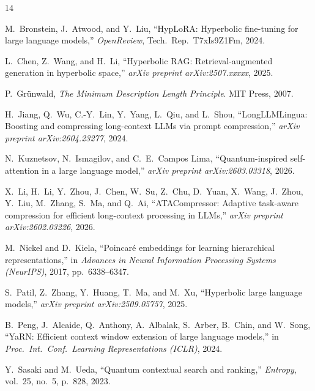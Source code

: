 \documentclass[journal]{IEEEtran}
\begin{document}
\begin{thebibliography}{14}

M.~Bronstein, J.~Atwood, and Y.~Liu,
``HypLoRA: Hyperbolic fine-tuning for large language models,''
\emph{OpenReview}, Tech.\ Rep.\ T7xIs9Z1Fm, 2024.

L.~Chen, Z.~Wang, and H.~Li,
``Hyperbolic RAG: Retrieval-augmented generation in hyperbolic space,''
\emph{arXiv preprint arXiv:2507.xxxxx}, 2025.

P.~Gr\"{u}nwald,
\emph{The Minimum Description Length Principle}.
MIT Press, 2007.

H.~Jiang, Q.~Wu, C.-Y.~Lin, Y.~Yang, L.~Qiu, and L.~Shou,
``LongLLMLingua: Boosting and compressing long-context {LLMs} via prompt
compression,''
\emph{arXiv preprint arXiv:2604.23277}, 2024.

N.~Kuznetsov, N.~Ismagilov, and C.~E.~Campos Lima,
``Quantum-inspired self-attention in a large language model,''
\emph{arXiv preprint arXiv:2603.03318}, 2026.

X.~Li, H.~Li, Y.~Zhou, J.~Chen, W.~Su, Z.~Chu, D.~Yuan, X.~Wang,
J.~Zhou, Y.~Liu, M.~Zhang, S.~Ma, and Q.~Ai,
``{ATACompressor}: Adaptive task-aware compression for efficient
long-context processing in {LLMs},''
\emph{arXiv preprint arXiv:2602.03226}, 2026.

M.~Nickel and D.~Kiela,
``Poincar\'{e} embeddings for learning hierarchical representations,''
in \emph{Advances in Neural Information Processing Systems (NeurIPS)},
2017, pp.~6338--6347.

S.~Patil, Z.~Zhang, Y.~Huang, T.~Ma, and M.~Xu,
``Hyperbolic large language models,''
\emph{arXiv preprint arXiv:2509.05757}, 2025.

B.~Peng, J.~Alcaide, Q.~Anthony, A.~Albalak, S.~Arber, B.~Chin,
and W.~Song,
``{YaRN}: Efficient context window extension of large language models,''
in \emph{Proc.\ Int.\ Conf.\ Learning Representations (ICLR)}, 2024.

Y.~Sasaki and M.~Ueda,
``Quantum contextual search and ranking,''
\emph{Entropy}, vol.~25, no.~5, p.~828, 2023.


\end{thebibliography}
\end{document}
